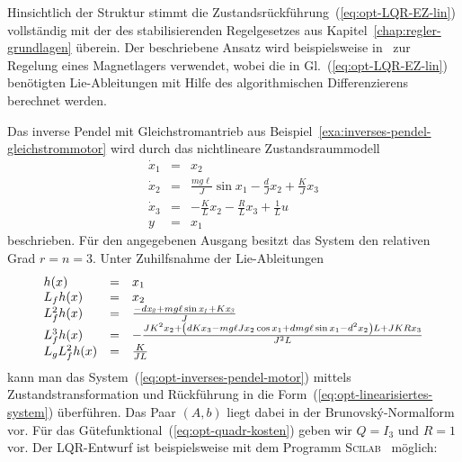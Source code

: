 Hinsichtlich der Struktur stimmt die Zustandsrückführung~(\ref{eq:opt-LQR-EZ-lin})
vollständig mit der des stabilisierenden Regelgesetzes aus Kapitel~\ref{chap:regler-grundlagen}
überein. Der beschriebene Ansatz wird beispielsweise in~\cite{palis2008}
zur Regelung eines Magnet\-lagers verwendet, wobei die in Gl.~(\ref{eq:opt-LQR-EZ-lin})
benötigten Lie-Ableitungen mit Hilfe des algorithmischen Differenzierens
berechnet werden.

\begin{example}
\label{exa:Inverses-Pendel-Motor-LQR}Das inverse Pendel mit Gleichstromantrieb
aus Beispiel~\ref{exa:inverses-pendel-gleichstrommotor} wird durch
das nichtlineare Zustandsraummodell
\begin{equation}
\begin{array}{lcl}
\dot{x}_{1} & = & x_{2}\\
\dot{x}_{2} & = & \frac{mg\ell}{J}\sin x_{1}-\frac{d}{J}x_{2}+\frac{K}{J}x_{3}\\
\dot{x}_{3} & = & -\frac{K}{L}x_{2}-\frac{R}{L}x_{3}+\frac{1}{L}u\\
y & = & x_{1}
\end{array}\label{eq:opt-inverses-pendel-motor}
\end{equation}
beschrieben. Für den angegebenen Ausgang besitzt das System den relativen
Grad $r=n=3$. Unter Zuhilfsnahme der Lie-Ableitungen 
\begin{equation}
\begin{array}{lcl}
h(x) & = & x_{1}\\
L_{f}h(x) & = & x_{2}\\
L_{f}^{2}h(x) & = & \frac{-d{\it x_{2}}+mg\ell\sin{\it x_{1}}+K{\it x_{3}}}{J}\\
L_{f}^{3}h(x) & = & -\frac{JK^{2}x_{2}+\left(dKx_{3}-mg\ell Jx_{2}\cos x_{1}+dmg\ell\sin x_{1}-d^{2}x_{2}\right)L+JKRx_{3}}{J^{2}L}\\
L_{g}L_{f}^{2}h(x) & = & \frac{K}{JL}
\end{array}\label{eq:opt-inv-pendel-motor-lie}
\end{equation}
kann man das System~(\ref{eq:opt-inverses-pendel-motor}) mittels
Zustandstransformation und Rückführung in die Form~(\ref{eq:opt-linearisiertes-system})
überführen. Das Paar $(A,b)$ liegt dabei in der Brunovský-Normalform
vor. Für das Gütefunktional~(\ref{eq:opt-quadr-kosten}) geben wir
$Q=I_{3}$ und $R=1$ vor. Der LQR-Entwurf ist beispielsweise mit
dem Programm \textsc{Scilab}~\cite{scilabhomepage} möglich:

\begin{maxima}\end{maxima}


\end{example}
